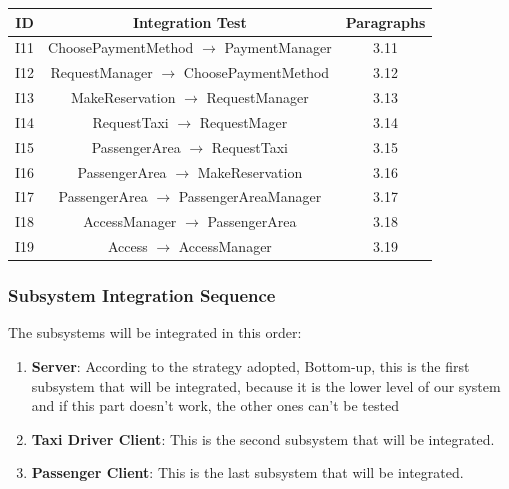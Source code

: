 \documentclass[18pt,oneside,a4paper, titlepage]{article}
\begin{document}
			\begin{center}
				\centering
				\begin{tabular}{|c| c| c|}
					\hline \textbf{ID} & \textbf{Integration Test} & \textbf{Paragraphs} \\
					\hline		I11 & ChoosePaymentMethod $\rightarrow$ PaymentManager & 3.11\\
					\hline		I12 & RequestManager $\rightarrow$ ChoosePaymentMethod & 3.12 \\
					\hline		I13 & MakeReservation $\rightarrow$ RequestManager & 3.13\\
					\hline		I14 & RequestTaxi $\rightarrow$ RequestMager & 3.14\\
					\hline		I15 & PassengerArea $\rightarrow$ RequestTaxi & 3.15 \\
					\hline		I16 & PassengerArea $\rightarrow$ MakeReservation & 3.16 \\
					\hline		I17 & PassengerArea $\rightarrow$ PassengerAreaManager & 3.17\\
					\hline		I18 & AccessManager $\rightarrow$ PassengerArea & 3.18 \\
					\hline		I19 & Access $\rightarrow$ AccessManager & 3.19 \\
					\hline
				\end{tabular}
			\end{center}
		\subsubsection{Subsystem Integration Sequence}
			The subsystems will be integrated in this order:
			\begin{enumerate}
				\item \textbf{Server}: According to the strategy adopted, Bottom-up, this is the first subsystem that will be integrated, because it is the lower level of our system and if this part doesn't work, the other ones can't be tested
				\item \textbf{Taxi Driver Client}: This is the second subsystem that will be integrated.
				\item \textbf{Passenger Client}: This is the last subsystem that will be integrated.
			\end{enumerate}
\end{document}
